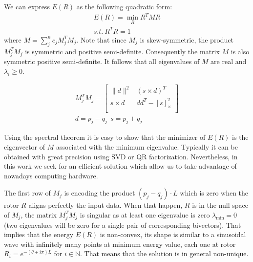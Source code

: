 \documentclass{birkjour}
\numberwithin{equation}{section}
\begin{document}
We can express $E(R)$ as the following quadratic form:
\begin{eqnarray*}
E(R) = \min_R R^T M R\\
s.t. \ R^T R = 1
\end{eqnarray*}
where $M = \sum_j^n { c_j M_j^T M_j}$. Note that since $M_j$ is skew-symmetric, the product $M_j^T M_j$ is symmetric and positive semi-definite.
Consequently the matrix $M$ is also symmetric positive semi-definite. It follows that all eigenvalues of $M$ are real and $\lambda_i \geq 0$.

\begin{eqnarray*}
M_j^T M_j = 
\left[\begin{array}{cc}
\| d \|^2 & (s \times d)^T \\
s \times d & d d^T - \left[ s \right]^2_\times \\
\end{array}\right]\\
d = p_j - q_j \ \ s = p_j + q_j
\end{eqnarray*}

Using the spectral theorem it is easy to show that the minimizer of $E(R)$ is the eigenvector of $M$ associated with the minimum eigenvalue.
Typically it can be obtained with great precision using SVD or QR factorization.
Nevertheless, in this work we seek for an efficient solution which allow us to take advantage of nowadays computing hardware.

The first row of $M_j$ is encoding the product $(p_j - q_j) \cdot L$ which is zero when the rotor $R$ aligns perfectly the input data. When that happen, $R$ is in the null space of $M_j$, the matrix $M_j^T M_j$ is singular as at least one eigenvalue is zero $\lambda_{\min} = 0$ (two eigenvalues will be zero for a single pair of corresponding bivectors). That implies that the energy $E(R)$ is non-convex, its shape is similar to a sinusoidal wave with infinitely many points at minimum energy value, each one at rotor $R_i = e^{-(\theta + i \pi) L}$ for $i \in \mathbb N$. That means that the solution is in general non-unique.
\end{document}
